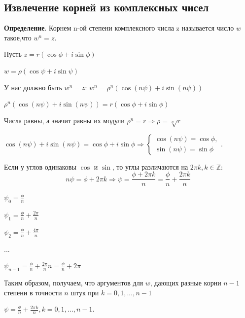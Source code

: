 \documentclass[a4paper]{article}
\begin{document}
    \subsection*{Извлечение корней из комплексных чисел
    }
    \textbf{Определение}. Корнем n-ой степени комплексного числа z называется число $w$ такое,\newline что $w^n = z$.


    Пусть $z = r(\cos \phi + i \sin \phi)$

    $w = \rho (\cos \psi + i \sin \psi)$

    У нас должно быть $w^n = z$: $w^n = \rho^n (\cos (n \psi) + i \sin (n \psi))$

    $\rho^n (\cos (n \psi) + i \sin (n \psi)) = r (\cos  \phi + i \sin \phi)$

    Числа равны, а значит равны их модули $\rho^n = r \Rightarrow \rho = \sqrt[n]{r}$

    $\cos (n \psi) + i \sin (n \psi) = \cos  \phi + i \sin \phi \Rightarrow \begin{cases}
                                                                                \cos (n \psi) = \cos \phi,
                                                                                \\
                                                                                \sin (n \psi) = \sin \phi
    \end{cases}$.

    Если у углов одинаковы $\cos$ и $\sin$, то углы различаются на $2\pi k, k \in \mathbb{Z}$:
    \begin{equation}
        n \psi = \phi + 2\pi k \Rightarrow \psi = \frac{\phi + 2 \pi k}{n} = \frac{\phi}{n} + \frac{2 \pi k}{n}
    \end{equation}

    $\displaystyle \psi_0 = \frac{\phi}{n}$

    $\displaystyle \psi_1 = \frac{\phi}{n} + \frac{2\pi}{n}$

    $\displaystyle \psi_2 = \frac{\phi}{n} + \frac{4\pi}{n}$

    ...

    $\displaystyle \psi_{n-1} = \frac{\phi}{n} + \frac{2\pi}{n}n = \frac{\phi}{n} + 2\pi$

    Таким образом, получаем, что аргументов для $w$, дающих разные корни $n-1$ степени в точности $n$ штук при $k =0, 1, ..., n-1$

    $\psi = \frac{\phi}{n} + \frac{2\pi k}{n}, k = 0, 1, ..., n-1$.
\end{document}
